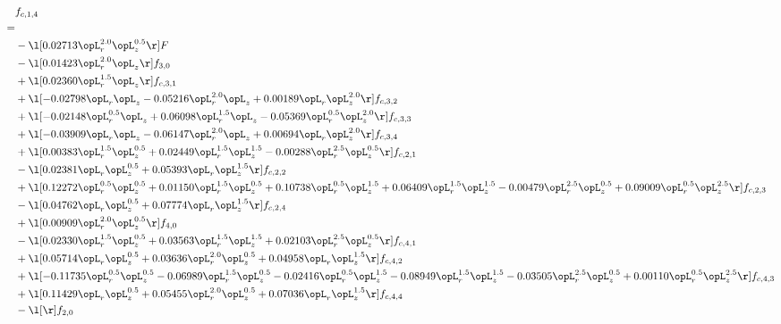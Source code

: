 \begin{alignat}{2} 
\label{eq:f_14_2} 
& f_{c,1,4} \nonumber \\ 
 = \\ 
& - \l[  0.02713 \opL_r^{2.0} \opL_z^{0.5}  \r] F \nonumber \\ 
& - \l[  0.01423 \opL_r^{2.0} \opL_z  \r] f_{3,0} \nonumber \\ 
& + \l[  0.02360 \opL_r^{1.5} \opL_z  \r] f_{c,3,1} \nonumber \\ 
& + \l[  -0.02798 \opL_r \opL_z   -0.05216 \opL_r^{2.0} \opL_z +  0.00189 \opL_r \opL_z^{2.0}  \r] f_{c,3,2} \nonumber \\ 
& + \l[  -0.02148 \opL_r^{0.5} \opL_z +  0.06098 \opL_r^{1.5} \opL_z   -0.05369 \opL_r^{0.5} \opL_z^{2.0}  \r] f_{c,3,3} \nonumber \\ 
& + \l[  -0.03909 \opL_r \opL_z   -0.06147 \opL_r^{2.0} \opL_z +  0.00694 \opL_r \opL_z^{2.0}  \r] f_{c,3,4} \nonumber \\ 
& + \l[  0.00383 \opL_r^{1.5} \opL_z^{0.5} +  0.02449 \opL_r^{1.5} \opL_z^{1.5}   -0.00288 \opL_r^{2.5} \opL_z^{0.5}  \r] f_{c,2,1} \nonumber \\ 
& - \l[  0.02381 \opL_r \opL_z^{0.5} +  0.05393 \opL_r \opL_z^{1.5}  \r] f_{c,2,2} \nonumber \\ 
& + \l[  0.12272 \opL_r^{0.5} \opL_z^{0.5} +  0.01150 \opL_r^{1.5} \opL_z^{0.5} +  0.10738 \opL_r^{0.5} \opL_z^{1.5} +  0.06409 \opL_r^{1.5} \opL_z^{1.5}   -0.00479 \opL_r^{2.5} \opL_z^{0.5} +  0.09009 \opL_r^{0.5} \opL_z^{2.5}  \r] f_{c,2,3} \nonumber \\ 
& - \l[  0.04762 \opL_r \opL_z^{0.5} +  0.07774 \opL_r \opL_z^{1.5}  \r] f_{c,2,4} \nonumber \\ 
& + \l[  0.00909 \opL_r^{2.0} \opL_z^{0.5}  \r] f_{4,0} \nonumber \\ 
& - \l[  0.02330 \opL_r^{1.5} \opL_z^{0.5} +  0.03563 \opL_r^{1.5} \opL_z^{1.5} +  0.02103 \opL_r^{2.5} \opL_z^{0.5}  \r] f_{c,4,1} \nonumber \\ 
& + \l[  0.05714 \opL_r \opL_z^{0.5} +  0.03636 \opL_r^{2.0} \opL_z^{0.5} +  0.04958 \opL_r \opL_z^{1.5}  \r] f_{c,4,2} \nonumber \\ 
& + \l[  -0.11735 \opL_r^{0.5} \opL_z^{0.5}   -0.06989 \opL_r^{1.5} \opL_z^{0.5}   -0.02416 \opL_r^{0.5} \opL_z^{1.5}   -0.08949 \opL_r^{1.5} \opL_z^{1.5}   -0.03505 \opL_r^{2.5} \opL_z^{0.5} +  0.00110 \opL_r^{0.5} \opL_z^{2.5}  \r] f_{c,4,3} \nonumber \\ 
& + \l[  0.11429 \opL_r \opL_z^{0.5} +  0.05455 \opL_r^{2.0} \opL_z^{0.5} +  0.07036 \opL_r \opL_z^{1.5}  \r] f_{c,4,4} \nonumber \\ 
& - \l[  \r] f_{2,0} \nonumber \\ 
\end{alignat} 



